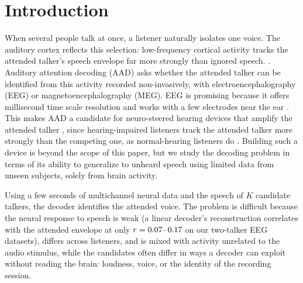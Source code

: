 \documentclass[10pt,twocolumn,letterpaper]{article}
\begin{document}
\section{Introduction}

When several people talk at once, a listener naturally isolates one voice. The auditory cortex reflects this selection: low-frequency cortical activity tracks the attended talker's speech envelope far more strongly than ignored speech.
\citep{ding2012emergence,mesgarani2012selective,osullivan2015attentional}. Auditory
attention decoding (AAD) asks whether the attended talker can be identified from this
activity recorded non-invasively, with electroencephalography (EEG) or magnetoencephalography
(MEG). %
EEG is promising because it offers millisecond time scale resolution and works with a few electrodes near the ear \citep{mirkovic2015decoding,fiedler2017single}. This makes AAD a
candidate for neuro-steered hearing devices that amplify the attended talker
\citep{geirnaert2021eeg}, since hearing-impaired
listeners track the attended talker more strongly than the competing one, as normal-hearing
listeners do \citep{petersen2017neural,decruy2020hearing,fuglsang2020effects}. Building such a device is
beyond the scope of this paper, but we study the decoding problem in terms of its ability to generalize to unheard speech using limited data from unseen subjects, solely from brain activity. 

Using a few seconds of multichannel neural data and the speech of $K$ candidate talkers, the decoder identifies the attended voice.
The problem is difficult because the neural response to speech is weak (a linear decoder's reconstruction correlates with the attended envelope at only $r=0.07$--$0.17$ on our two-talker EEG datasets),
differs across listeners, and is mixed with activity unrelated to the audio stimulus, while the
candidates often differ in ways a decoder can exploit without reading the brain: loudness,
voice, or the identity of the recording session.
\end{document}
